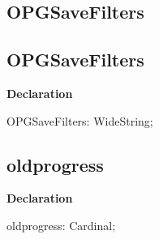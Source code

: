 \documentclass{report}
\newif\ifpdf
\begin{document}
\subsection*{\large{\textbf{OPGSaveFilters}}\normalsize\hspace{1ex}\hrulefill}
\else
\subsection*{OPGSaveFilters}
\fi
\label{opbitmapformats-OPGSaveFilters}
\begin{list}{}{
\setlength{\itemindent}{0cm}
\setlength{\listparindent}{0cm}
\setlength{\leftmargin}{\evensidemargin}
\addtolength{\leftmargin}{\tmplength}
\settowidth{\labelsep}{X}
\addtolength{\leftmargin}{\labelsep}
\setlength{\labelwidth}{\tmplength}
}
\item[\textbf{Declaration}\hfill]
\ifpdf
\begin{flushleft}
\fi
\begin{ttfamily}
OPGSaveFilters: WideString;\end{ttfamily}

\ifpdf
\end{flushleft}
\fi

\end{list}
\ifpdf
\subsection*{\large{\textbf{oldprogress}}\normalsize\hspace{1ex}\hrulefill}
\else
\subsection*{oldprogress}
\fi
\label{opbitmapformats-oldprogress}
\begin{list}{}{
\setlength{\itemindent}{0cm}
\setlength{\listparindent}{0cm}
\setlength{\leftmargin}{\evensidemargin}
\addtolength{\leftmargin}{\tmplength}
\settowidth{\labelsep}{X}
\addtolength{\leftmargin}{\labelsep}
\setlength{\labelwidth}{\tmplength}
}
\item[\textbf{Declaration}\hfill]
\ifpdf
\begin{flushleft}
\fi
\begin{ttfamily}
oldprogress: Cardinal;\end{ttfamily}

\ifpdf
\end{flushleft}
\fi

\end{list}
\end{document}
